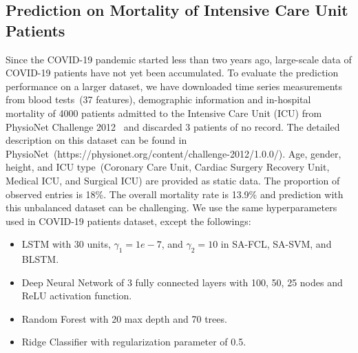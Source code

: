 



\subsection{Prediction on Mortality of Intensive Care Unit Patients}
Since the COVID-19 pandemic started less than two years ago, large-scale data of COVID-19 patients have not yet been accumulated. To evaluate the prediction performance on a larger dataset, we have downloaded time series measurements from blood tests~(37 features), demographic information and in-hospital mortality of 4000 patients admitted to the Intensive Care Unit (ICU) from PhysioNet Challenge 2012~\cite{silva2012predicting} and discarded 3 patients of no record. The detailed description on this dataset can be found in PhysioNet~(https://physionet.org/content/challenge-2012/1.0.0/). Age, gender, height, and ICU type~(Coronary Care Unit, Cardiac Surgery Recovery Unit, Medical ICU, and Surgical ICU) are provided as static data. The proportion of observed entries is 18\%. The overall mortality rate is 13.9\% and prediction with this unbalanced dataset can be challenging. We use the same hyperparameters used in COVID-19 patients dataset, except the followings:
\begin{itemize}
    \item LSTM with 30 units, $\gamma_1=1e-7$, and $\gamma_2=10$ in SA-FCL, SA-SVM, and BLSTM.
    \item Deep Neural Network of 3 fully connected layers with 100, 50, 25 nodes and ReLU activation function.
    \item Random Forest with 20 max depth and 70 trees.
    \item Ridge Classifier with regularization parameter of 0.5.
\end{itemize}

